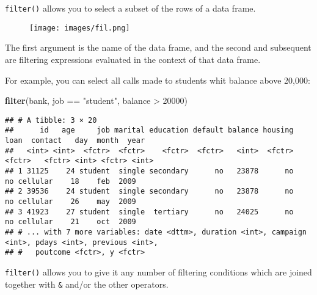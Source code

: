 \documentclass[]{book}
\newenvironment{Shaded}{\begin{snugshade}}{\end{snugshade}}
\newcommand{\KeywordTok}[1]{\textcolor[rgb]{0.13,0.29,0.53}{\textbf{{#1}}}}
\newcommand{\DecValTok}[1]{\textcolor[rgb]{0.00,0.00,0.81}{{#1}}}
\newcommand{\StringTok}[1]{\textcolor[rgb]{0.31,0.60,0.02}{{#1}}}
\newcommand{\CommentTok}[1]{\textcolor[rgb]{0.56,0.35,0.01}{\textit{{#1}}}}
\newcommand{\NormalTok}[1]{{#1}}
\begin{document}
\texttt{filter()} allows you to select a subset of the rows of a data
frame.

\begin{figure}[htbp]
\centering
\texttt{[image: images/fil.png]}
\caption{}
\end{figure}

The first argument is the name of the data frame, and the second and
subsequent are filtering expressions evaluated in the context of that
data frame.

For example, you can select all calls made to students whit balance
above 20,000:

\begin{Shaded}
\begin{Highlighting}[]
\KeywordTok{filter}\NormalTok{(bank, job ==}\StringTok{ "student"}\NormalTok{, balance >}\StringTok{ }\DecValTok{20000}\NormalTok{)}
\end{Highlighting}
\end{Shaded}

\begin{verbatim}
## # A tibble: 3 × 20
##      id   age     job marital education default balance housing   loan  contact   day  month  year
##   <int> <int>  <fctr>  <fctr>    <fctr>  <fctr>   <int>  <fctr> <fctr>   <fctr> <int> <fctr> <int>
## 1 31125    24 student  single secondary      no   23878      no     no cellular    18    feb  2009
## 2 39536    24 student  single secondary      no   23878      no     no cellular    26    may  2009
## 3 41923    27 student  single  tertiary      no   24025      no     no cellular    21    oct  2009
## # ... with 7 more variables: date <dttm>, duration <int>, campaign <int>, pdays <int>, previous <int>,
## #   poutcome <fctr>, y <fctr>
\end{verbatim}

\texttt{filter()} allows you to give it any number of filtering
conditions which are joined together with \texttt{\&} and/or the other
operators.

\begin{Shaded}
\end{Shaded}
\end{document}
